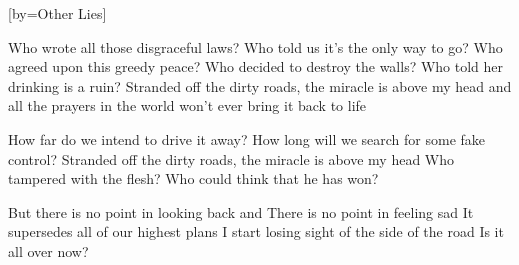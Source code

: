 [by={Other Lies}]

  \chordsoff
  \beginverse
  Who wrote all those disgraceful laws? 
  Who told us it’s the only way to go?
  Who agreed upon this greedy peace? 
  Who decided to destroy the walls?
  Who told her drinking is a ruin?
  Stranded off the dirty roads, the miracle is above my head 
  and all the prayers in the world won’t ever bring it back to life 
  \endverse

  \beginverse
  How far do we intend to drive it away?
  How long will we search for some fake control?
  Stranded off the dirty roads, the miracle is above my head 
  Who tampered with the flesh? Who could think that he has won?
  \endverse

  \beginverse
  But there is no point in looking back
  and There is no point in feeling sad
  It supersedes all of our highest plans
  I start losing sight of the side of the road
  Is it all over now? 
  \endverse
\endsong
